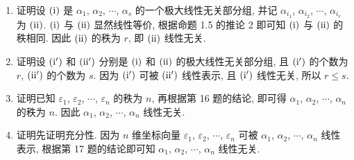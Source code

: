 \begin{enumerate}
    \item %
        {\heiti 证明}\quad 设 $(\mathrm{\uppercase\expandafter{\romannumeral1}})$ 是 $\alpha_1$, $\alpha_2$, $\cdots$, $\alpha_s$ 的一个极大线性无关部分组, 并记 $\alpha_{i_1}$, $\alpha_{i_2}$, $\cdots$, $\alpha_{i_r}$ 为 $(\mathrm{\uppercase\expandafter{\romannumeral2}})$.
        $(\mathrm{\uppercase\expandafter{\romannumeral1}})$ 与 $(\mathrm{\uppercase\expandafter{\romannumeral2}})$ 显然线性等价, 根据{\heiti 命题 1.5} 的{\heiti 推论 2} 即可知 $(\mathrm{\uppercase\expandafter{\romannumeral1}})$ 与 $(\mathrm{\uppercase\expandafter{\romannumeral2}})$ 的秩相同.
        因此 $(\mathrm{\uppercase\expandafter{\romannumeral2}})$ 的秩为 $r$, 即 $(\mathrm{\uppercase\expandafter{\romannumeral2}})$ 线性无关.
    \item %
        {\heiti 证明}\quad 设 $(\mathrm{\uppercase\expandafter{\romannumeral1'}})$ 和 $(\mathrm{\uppercase\expandafter{\romannumeral2'}})$ 分别是 $(\mathrm{\uppercase\expandafter{\romannumeral1}})$ 和 $(\mathrm{\uppercase\expandafter{\romannumeral2}})$ 的极大线性无关部分组, 且 $(\mathrm{\uppercase\expandafter{\romannumeral1'}})$ 的个数为 $r$, $(\mathrm{\uppercase\expandafter{\romannumeral2'}})$ 的个数为 $s$.
        因为 $(\mathrm{\uppercase\expandafter{\romannumeral1'}})$ 可被 $(\mathrm{\uppercase\expandafter{\romannumeral2'}})$ 线性表示, 且 $(\mathrm{\uppercase\expandafter{\romannumeral1'}})$ 线性无关, 所以 $r \leqslant s$. 
    \item %
        {\heiti 证明}\quad 已知 $\varepsilon_1$, $\varepsilon_2$, $\cdots$, $\varepsilon_n$ 的秩为 $n$, 再根据{\heiti 第 16 题}的结论, 即可得 $\alpha_1$, $\alpha_2$, $\cdots$, $\alpha_n$ 的秩为 $n$.
        因此 $\alpha_1$, $\alpha_2$, $\cdots$, $\alpha_n$ 线性无关.
    \item %
        {\heiti 证明}\quad 先证明充分性. 因为 $n$ 维坐标向量 $\varepsilon_1$, $\varepsilon_2$, $\cdots$, $\varepsilon_n$ 可被 $\alpha_1$, $\alpha_2$, $\cdots$, $\alpha_n$ 线性表示, 根据{\heiti 第 17 题}的结论即可知 $\alpha_1$, $\alpha_2$, $\cdots$, $\alpha_n$ 线性无关.
        

\end{enumerate}
